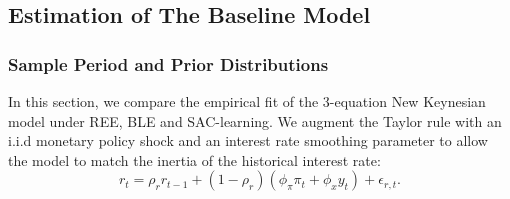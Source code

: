 \subsection{Estimation of The Baseline Model} 
\label{sec:estimation_ble}

\subsubsection*{Sample Period and Prior Distributions}

In this section, we compare the empirical fit of the 3-equation New Keynesian model under  REE, BLE and SAC-learning. We augment the Taylor rule with an i.i.d monetary policy shock and an interest rate smoothing parameter to allow the model to match the inertia of the historical interest rate: 
\begin{equation}
r_t = \rho_r r_{t-1} + (1-\rho_r) (\phi_{\pi}\pi_t +\phi_x y_t) +\epsilon_{r,t}.
\label{eqn:3_1}
\end{equation}

\noindent

